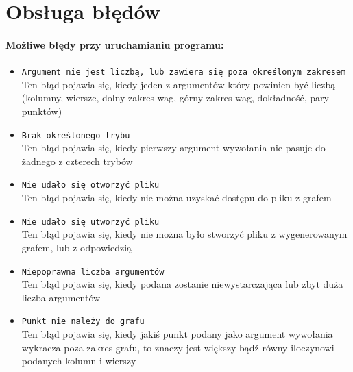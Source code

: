 \documentclass{article}
\begin{document}
\section{Obsługa błędów}
\paragraph{Możliwe błędy przy uruchamianiu programu:}

\begin{itemize}

\item \texttt{Argument nie jest liczbą, lub zawiera się poza określonym zakresem} \\ 
Ten błąd pojawia się, kiedy jeden z argumentów który powinien być liczbą (kolumny, wiersze, dolny zakres wag, górny zakres wag, dokładność, pary punktów)

\item \texttt{Brak określonego trybu} \\
Ten błąd pojawia się, kiedy pierwszy argument wywołania nie pasuje do żadnego z czterech trybów 

\item \texttt{Nie udało się otworzyć pliku} \\
Ten błąd pojawia się, kiedy nie można uzyskać dostępu do pliku z grafem 
\item \texttt{Nie udało się utworzyć pliku} \\
Ten błąd pojawia się, kiedy nie można było stworzyć pliku z wygenerowanym grafem, lub z odpowiedzią 

\item \texttt{Niepoprawna liczba argumentów } \\
Ten błąd pojawia się, kiedy podana zostanie niewystarczająca lub zbyt duża liczba argumentów 

\item \texttt{Punkt nie należy do grafu} \\
Ten błąd pojawia się, kiedy jakiś punkt podany jako argument wywołania wykracza poza zakres grafu, to znaczy jest większy bądź równy iloczynowi podanych kolumn i wierszy

\end{itemize}
\end{document}
